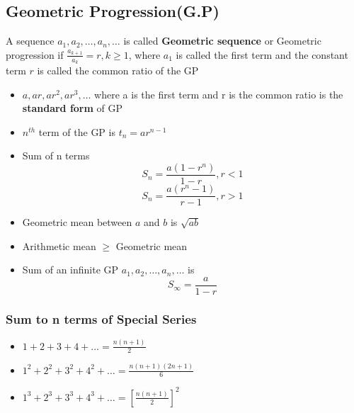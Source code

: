 \documentclass[12pt]{article}
\begin{document}
\begin{multicols}{2}
    \subsection*{Geometric Progression(G.P)}
    A sequence $a_1, a_2, \dots, a_n,\dots$ is called \textbf{Geometric sequence} or Geometric progression if $\frac{a_{k+1}}{a_k}=r , k \geq 1$, where $a_1$ is called the first term and the constant term $r$ is called the common ratio of the GP
    \begin{itemize}
        \item $a,ar,ar^2,ar^3,\dots$ where a is the first term and r is the common ratio is the \textbf{standard form} of GP
        \item $n^{th}$ term of the GP is $t_n=ar^{n-1}$
        \item Sum of n terms 
         $$S_n=\frac{a(1-r^n)}{1-r}, r<1$$
         $$S_n = \frac{a(r^n -1)}{r-1}, r >1$$
    \item Geometric mean between $a$ and $b$ is $\sqrt{ab}$
    \item Arithmetic mean $\geq$ Geometric mean
    \item Sum of an infinite GP $a_1, a_2, \dots, a_n,\dots$ is 
    $$S_{\infty} =\frac{a}{1-r}$$
    \end{itemize}

    \subsubsection*{Sum to n terms of Special Series}

    \begin{itemize}
        \item $1+2+3+4+\dots = \frac{n(n+1)}{2}$
        \item $1^2+2^2+3^2+4^2+\dots = \frac{n(n+1)(2n+1)}{6}$
        \item $1^3+2^3+3^3+4^3+\dots = [\frac{n (n+1)}{2}]^2$
    \end{itemize}



    
\end{multicols}
\end{document}
